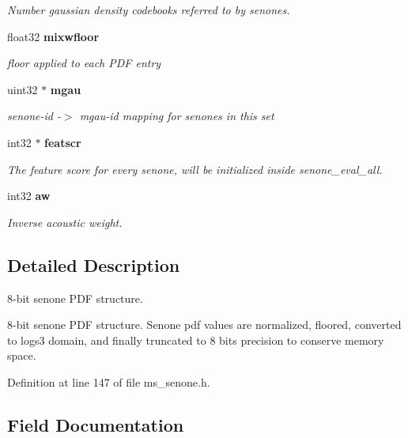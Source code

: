 \begin{DoxyCompactItemize}
\begin{DoxyCompactList}\small\item\em Number gaussian density codebooks referred to by senones. \end{DoxyCompactList}\item 
float32 {\bf mixwfloor}\label{structsenone__t_af3f77493f07dd1740084ea8dc4541cb1}

\begin{DoxyCompactList}\small\item\em floor applied to each P\-D\-F entry \end{DoxyCompactList}\item 
uint32 $\ast$ {\bf mgau}\label{structsenone__t_a5f0eee5a11e7c10b20e0cce10305edfc}

\begin{DoxyCompactList}\small\item\em senone-\/id -\/$>$ mgau-\/id mapping for senones in this set \end{DoxyCompactList}\item 
int32 $\ast$ {\bf featscr}\label{structsenone__t_a58af20c262d9d633f53c8c1c7e60459e}

\begin{DoxyCompactList}\small\item\em The feature score for every senone, will be initialized inside senone\-\_\-eval\-\_\-all. \end{DoxyCompactList}\item 
int32 {\bf aw}\label{structsenone__t_ad9b17f6aecf056fcea0eaaab0c7d35ca}

\begin{DoxyCompactList}\small\item\em Inverse acoustic weight. \end{DoxyCompactList}\end{DoxyCompactItemize}


\subsection{Detailed Description}
8-\/bit senone P\-D\-F structure. 

8-\/bit senone P\-D\-F structure. Senone pdf values are normalized, floored, converted to logs3 domain, and finally truncated to 8 bits precision to conserve memory space. 

Definition at line 147 of file ms\-\_\-senone.\-h.



\subsection{Field Documentation}
